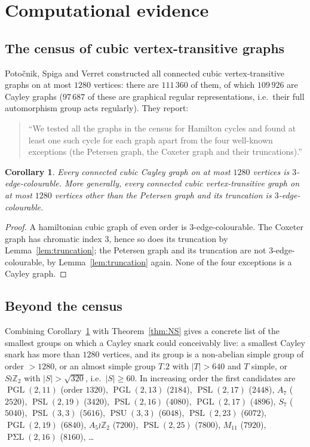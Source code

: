 \documentclass[11pt,a4paper]{article}
\newtheorem{corollary}[theorem]{Corollary}
\theoremstyle{definition}
\theoremstyle{remark}
\newcommand{\PSL}{\operatorname{PSL}}
\newcommand{\PGL}{\operatorname{PGL}}
\newcommand{\PSigmaL}{\operatorname{P\Sigma L}}
\newcommand{\ZZ}{\mathbb{Z}}
\begin{document}
\section{Computational evidence}\label{sec:computation}

\subsection{The census of cubic vertex-transitive graphs}
Poto\v{c}nik, Spiga and Verret \cite{PSV13} constructed all connected cubic vertex-transitive graphs on at most $1280$ vertices: there are $111\,360$ of them, of which $109\,926$ are Cayley graphs ($97\,687$ of these are graphical regular representations, i.e.\ their full automorphism group acts regularly).  They report:

\begin{quote}
``We tested all the graphs in the census for Hamilton cycles and found at least one such cycle for each graph apart from the four well-known exceptions (the Petersen graph, the Coxeter graph and their truncations).'' \cite[\S2]{PSV13}
\end{quote}

\begin{corollary}\label{cor:census}
Every connected cubic Cayley graph on at most $1280$ vertices is $3$-edge-colourable.  More generally, every connected cubic vertex-transitive graph on at most $1280$ vertices other than the Petersen graph and its truncation is $3$-edge-colourable.
\end{corollary}
\begin{proof}
A hamiltonian cubic graph of even order is $3$-edge-colourable.  The Coxeter graph has chromatic index $3$, hence so does its truncation by Lemma~\ref{lem:truncation}; the Petersen graph and its truncation are not $3$-edge-colourable, by Lemma~\ref{lem:truncation} again.  None of the four exceptions is a Cayley graph.
\end{proof}

\subsection{Beyond the census}
Combining Corollary~\ref{cor:census} with Theorem~\ref{thm:NS} gives a concrete list of the smallest groups on which a Cayley snark could conceivably live: a smallest Cayley snark has more than $1280$ vertices, and its group is a non-abelian simple group of order $>1280$, or an almost simple group $T.2$ with $|T|>640$ and $T$ simple, or $S\wr\ZZ_2$ with $|S|>\sqrt{320}$, i.e.\ $|S|\ge60$.  In increasing order the first candidates are $\PGL(2,11)$ (order $1320$), $\PGL(2,13)$ ($2184$), $\PSL(2,17)$ ($2448$), $A_7$ ($2520$), $\PSL(2,19)$ ($3420$), $\PSL(2,16)$ ($4080$), $\PGL(2,17)$ ($4896$), $S_7$ ($5040$), $\PSL(3,3)$ ($5616$), $\operatorname{PSU}(3,3)$ ($6048$), $\PSL(2,23)$ ($6072$), $\PGL(2,19)$ ($6840$), $A_5\wr\ZZ_2$ ($7200$), $\PSL(2,25)$ ($7800$), $M_{11}$ ($7920$), $\PSigmaL(2,16)$ ($8160$), \dots
\end{document}
